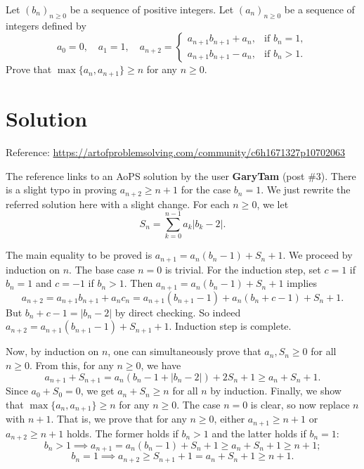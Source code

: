 Let $(b_n)_{n \geq 0}$ be a sequence of positive integers.
Let $(a_n)_{n \geq 0}$ be a sequence of integers defined by
\[ a_0 = 0, \quad a_1 = 1, \quad a_{n + 2} = \begin{cases} a_{n + 1} b_{n + 1} + a_n, & \text{if } b_n = 1, \\ a_{n + 1} b_{n + 1} - a_n, & \text{if } b_n > 1. \end{cases} \]
Prove that $\max\{a_n, a_{n + 1}\} \geq n$ for any $n \geq 0$.



\section*{Solution}

Reference: \url{https://artofproblemsolving.com/community/c6h1671327p10702063}

The reference links to an AoPS solution by the user \textbf{GaryTam} (post \#3).
There is a slight typo in proving $a_{n + 2} \geq n + 1$ for the case $b_n = 1$.
We just rewrite the referred solution here with a slight change.
For each $n \geq 0$, we let
\[ S_n = \sum_{k = 0}^{n - 1} a_k |b_k - 2|. \]

The main equality to be proved is $a_{n + 1} = a_n (b_n - 1) + S_n + 1$.
We proceed by induction on $n$.
The base case $n = 0$ is trivial.
For the induction step, set $c = 1$ if $b_n = 1$ and $c = -1$ if $b_n > 1$.
Then $a_{n + 1} = a_n (b_n - 1) + S_n + 1$ implies
\[ a_{n + 2} = a_{n + 1} b_{n + 1} + a_n c_n = a_{n + 1} (b_{n + 1} - 1) + a_n (b_n + c - 1) + S_n + 1. \]
But $b_n + c - 1 = |b_n - 2|$ by direct checking.
So indeed $a_{n + 2} = a_{n + 1} (b_{n + 1} - 1) + S_{n + 1} + 1$.
Induction step is complete.

Now, by induction on $n$, one can simultaneously prove that $a_n, S_n \geq 0$ for all $n \geq 0$.
From this, for any $n \geq 0$, we have
\[ a_{n + 1} + S_{n + 1} = a_n (b_n - 1 + |b_n - 2|) + 2 S_n + 1 \geq a_n + S_n + 1. \]
Since $a_0 + S_0 = 0$, we get $a_n + S_n \geq n$ for all $n$ by induction.
Finally, we show that $\max\{a_n, a_{n + 1}\} \geq n$ for any $n \geq 0$.
The case $n = 0$ is clear, so now replace $n$ with $n + 1$.
That is, we prove that for any $n \geq 0$, either $a_{n + 1} \geq n + 1$ or $a_{n + 2} \geq n + 1$ holds.
The former holds if $b_n > 1$ and the latter holds if $b_n = 1$:
\[ b_n > 1 \implies a_{n + 1} = a_n (b_n - 1) + S_n + 1 \geq a_n + S_n + 1 \geq n + 1; \]
\[ b_n = 1 \implies a_{n + 2} \geq S_{n + 1} + 1 = a_n + S_n + 1 \geq n + 1. \]
